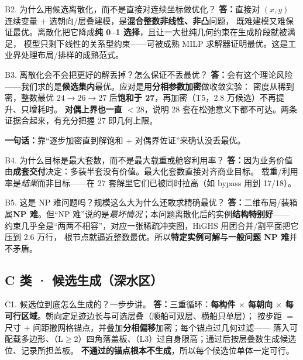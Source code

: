 \documentclass[11pt]{ctexart}
\newcommand{\A}{\textbf{答：}}
\newcommand{\oneline}[1]{\begin{key}\textbf{一句话：}#1\end{key}}
\begin{document}
\begin{qa}{B2. 为什么用候选离散化，而不是直接对连续坐标做优化？}
\A 直接对 $(x,y)$ 连续变量 + 选朝向/层叠建模，是\textbf{混合整数非线性、非凸}问题，
既难建模又难保证最优。离散化把它降成\textbf{纯 0--1 选择}，且让一大批纯几何约束在生成阶段就被满足，
模型只剩下线性的关系型约束——可被成熟 MILP 求解器证明最优。这是工业界处理布局/排样的成熟范式。
\end{qa}

\begin{qa}{B3. 离散化会不会把更好的解丢掉？怎么保证不丢最优？}
\A 会有这个理论风险——我们求的是\textbf{候选集内}最优。应对是用\textbf{分相参数加密}做收敛实验：
密度从稀到密，整数最优 $24\to26\to27$ 后\textbf{饱和于 27}，再加密（T5，2.8 万候选）不再提升、只增耗时。
\textbf{对偶上界也一直 $<28$}，说明 28 套在松弛意义下都不可达。两条证据合起来，有充分把握 27 即几何上限。
\oneline{靠“逐步加密直到解饱和 + 对偶界佐证”来确认没丢最优。}
\end{qa}

\begin{qa}{B4. 为什么目标是最大套数，而不是最大载重或舱容利用率？}
\A 因为业务价值由\textbf{成套交付}决定：多装半套没有价值。最大化套数直接对齐商业目标。
载重/利用率是\emph{结果}而非目标——在 27 套解里它们已被同时拉高（如 bypass 用到 17/18）。
\end{qa}

\begin{qa}{B5. 这是 NP 难问题吗？规模这么大为什么还敢求精确最优？}
\A 二维布局/装箱属\textbf{NP 难}。但“NP 难”说的是\emph{最坏情况}；本问题离散化后的实例\textbf{结构特别好}——
约束几乎全是“两两不相容”，对应一张稀疏冲突图，HiGHS 用团合并/割平面把它压到 2.6 万行，
根节点就逼近整数最优。所以\textbf{特定实例可解}与\textbf{一般问题 NP 难}并不矛盾。
\end{qa}

\subsection{C 类 · 候选生成（深水区）}

\begin{qa}{C1. 候选位到底怎么生成的？一步步讲。}
\A 三重循环：\textbf{每构件 $\times$ 每朝向 $\times$ 每可行区域}。朝向定足迹边长与可选层叠（顺船可双层、横船只单层）；
按步距 $=$ 尺寸 $+$ 间距撒网格锚点，并叠加\textbf{分相偏移}加密；每个锚点过几何过滤——
落入可配载多边形、（L$\ge$2）四角落盖板、（L3）过自身限高；通过后按层叠数生成候选位、记录所担盖板。
\textbf{不通过的锚点根本不生成}，所以每个候选位单体一定可行。
\end{qa}
\end{document}
